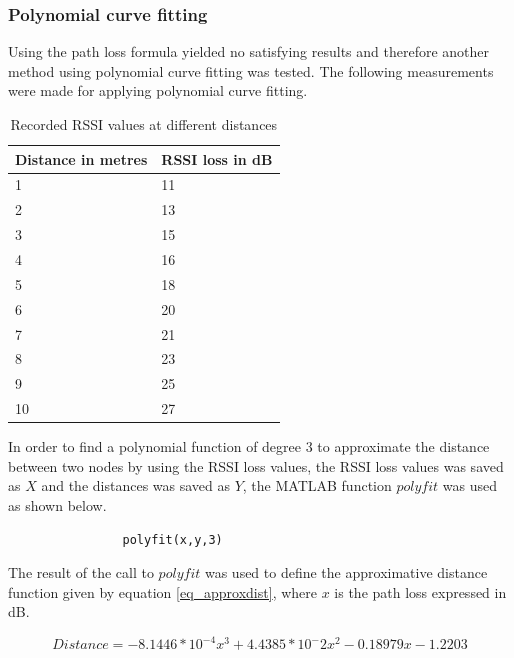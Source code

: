 		\subsubsection{Polynomial curve fitting}
		Using the path loss formula yielded no satisfying results and therefore another method using polynomial curve fitting was tested. The following measurements were made for applying polynomial curve fitting.

		\begin{table}[H]
			\centering
			\caption{Recorded RSSI values at different distances}
			\label{tbl_dist}
			\begin{tabular}{|l|l|}
				\hline
				{\bf Distance in metres} & {\bf RSSI loss in dB} \\ \hline
				1              & 11         \\
				2              & 13         \\
				3              & 15         \\
				4              & 16         \\
				5              & 18        	\\
				6              & 20    		\\
				7              & 21       	\\
				8              & 23         \\
				9              & 25         \\
				10             & 27         \\ \hline
			\end{tabular} 				
		\end{table}
			In order to find a polynomial function of degree $3$ to approximate the distance between two nodes by using the RSSI loss values, the RSSI loss values was saved as $X$ and the distances was saved as $Y$, the MATLAB function $polyfit$ was used as shown below.

			\begin{verbatim}
				polyfit(x,y,3)
			\end{verbatim}

			The result of the call to $polyfit$ was used to define the approximative distance function given by equation \ref{eq_approxdist}, where $x$ is the path loss expressed in dB.

			\begin{equation}\label{eq_approxdist}
				Distance = -8.1446*10^{-4}x^3 + 4.4385*10^-2x^2 - 0.18979x - 1.2203
			\end{equation}

